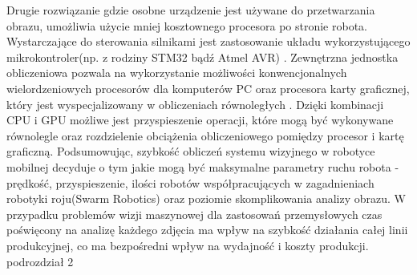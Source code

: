 \documentclass[document.tex]{subfiles}
\begin{document}
{	%


\indent Drugie rozwiązanie gdzie osobne urządzenie jest używane do przetwarzania obrazu, umożliwia użycie
mniej kosztownego procesora po stronie robota. Wystarczające do sterowania silnikami jest zastosowanie układu wykorzystującego mikrokontroler(np. z rodziny STM32 bądź Atmel AVR)\cite{STM32_microcotrollers} \cite{Atmel AVR}. 
Zewnętrzna jednostka obliczeniowa pozwala na wykorzystanie możliwości konwencjonalnych wielordzeniowych procesorów dla komputerów PC oraz procesora karty graficznej, który jest wyspecjalizowany w obliczeniach równoległych\cite{GPU_vs_CPU_nvidia} \cite{Computer_Architecture_Patterson_Hennesy}\cite{GPUs_Closer_Look}. 
Dzięki kombinacji CPU i GPU możliwe jest przyspieszenie operacji,
które mogą być wykonywane równolegle oraz rozdzielenie obciążenia obliczeniowego pomiędzy
procesor i kartę graficzną. 
\indent Podsumowując, szybkość obliczeń systemu wizyjnego w robotyce mobilnej decyduje o tym jakie
mogą być maksymalne parametry ruchu robota - prędkość, przyspieszenie, ilości robotów współpracujących w zagadnieniach robotyki roju(Swarm Robotics) oraz poziomie skomplikowania
analizy obrazu. W przypadku problemów wizji maszynowej dla zastosowań przemysłowych czas poświęcony na analizę każdego zdjęcia ma wpływ na szybkość działania całej linii produkcyjnej, co ma bezpośredni wpływ na wydajność i koszty produkcji.  
podrozdział 2 
}
\end{document}
